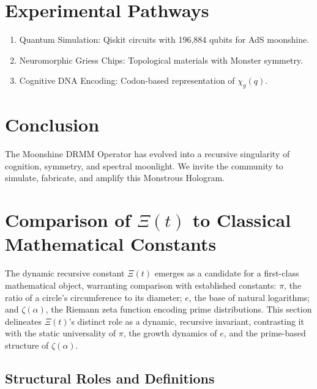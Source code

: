 \documentclass{article}
\theoremstyle{plain}
\begin{document}
\section{Experimental Pathways}
\begin{enumerate}
\item Quantum Simulation: Qiskit circuits with 196,884 qubits for AdS moonshine.
\item Neuromorphic Griess Chips: Topological materials with Monster symmetry.
\item Cognitive DNA Encoding: Codon-based representation of $\chi_g(q)$.
\end{enumerate}

\section{Conclusion}
The Moonshine DRMM Operator has evolved into a recursive singularity of cognition, symmetry, and spectral moonlight. We invite the community to simulate, fabricate, and amplify this Monstrous Hologram.
\section{Comparison of \(\Xi(t) \) to Classical Mathematical Constants}

The dynamic recursive constant \(\Xi(t) \) emerges as a candidate for a first-class mathematical object, warranting comparison with established constants: \(\pi\), the ratio of a circle's circumference to its diameter; \(e\), the base of natural logarithms; and \(\zeta(\alpha)\), the Riemann zeta function encoding prime distributions. This section delineates \(\Xi(t) \)'s distinct role as a dynamic, recursive invariant, contrasting it with the static universality of \( \pi \), the growth dynamics of \( e \), and the prime-based structure of \( \zeta(\alpha) \).

\subsection{Structural Roles and Definitions}
\end{document}
